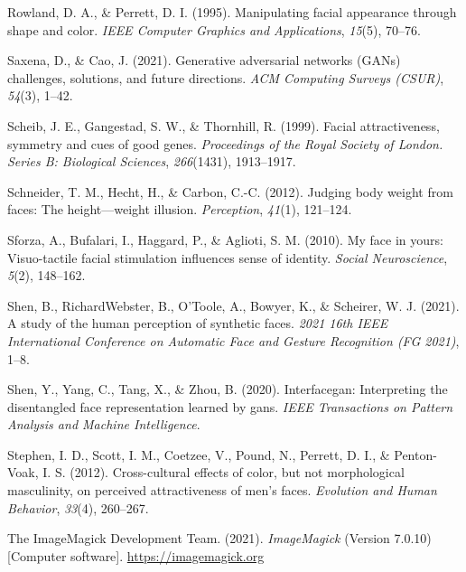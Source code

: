 \documentclass[
  doc,floatsintext]{apa6}
\newlength{\cslhangindent}
\newlength{\cslentryspacingunit} %
\newenvironment{CSLReferences}[2] %
 {%
  \setlength{\parindent}{0pt}
  \ifodd #1
  \let\oldpar\par
  \def\par{\hangindent=\cslhangindent\oldpar}
  \fi
  \setlength{\parskip}{#2\cslentryspacingunit}
 }%
 {}
\begin{document}
\begin{CSLReferences}{1}{0}
\leavevmode{}%
Rowland, D. A., \& Perrett, D. I. (1995). Manipulating facial appearance through shape and color. \emph{IEEE Computer Graphics and Applications}, \emph{15}(5), 70--76.

\leavevmode{}%
Saxena, D., \& Cao, J. (2021). Generative adversarial networks (GANs) challenges, solutions, and future directions. \emph{ACM Computing Surveys (CSUR)}, \emph{54}(3), 1--42.

\leavevmode{}%
Scheib, J. E., Gangestad, S. W., \& Thornhill, R. (1999). Facial attractiveness, symmetry and cues of good genes. \emph{Proceedings of the Royal Society of London. Series B: Biological Sciences}, \emph{266}(1431), 1913--1917.

\leavevmode{}%
Schneider, T. M., Hecht, H., \& Carbon, C.-C. (2012). Judging body weight from faces: The height---weight illusion. \emph{Perception}, \emph{41}(1), 121--124.

\leavevmode{}%
Sforza, A., Bufalari, I., Haggard, P., \& Aglioti, S. M. (2010). My face in yours: Visuo-tactile facial stimulation influences sense of identity. \emph{Social Neuroscience}, \emph{5}(2), 148--162.

\leavevmode{}%
Shen, B., RichardWebster, B., O'Toole, A., Bowyer, K., \& Scheirer, W. J. (2021). A study of the human perception of synthetic faces. \emph{2021 16th IEEE International Conference on Automatic Face and Gesture Recognition (FG 2021)}, 1--8.

\leavevmode{}%
Shen, Y., Yang, C., Tang, X., \& Zhou, B. (2020). Interfacegan: Interpreting the disentangled face representation learned by gans. \emph{IEEE Transactions on Pattern Analysis and Machine Intelligence}.

\leavevmode{}%
Stephen, I. D., Scott, I. M., Coetzee, V., Pound, N., Perrett, D. I., \& Penton-Voak, I. S. (2012). Cross-cultural effects of color, but not morphological masculinity, on perceived attractiveness of men's faces. \emph{Evolution and Human Behavior}, \emph{33}(4), 260--267.

\leavevmode{}%
The ImageMagick Development Team. (2021). \emph{ImageMagick} (Version 7.0.10) {[}Computer software{]}. \url{https://imagemagick.org}


\end{CSLReferences}
\end{document}
